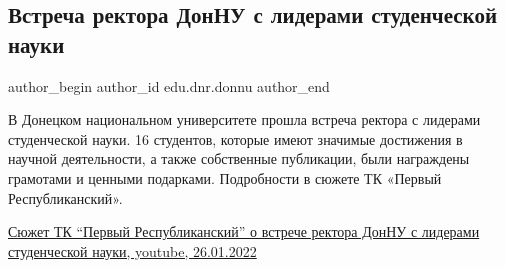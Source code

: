  
 
 
 
 
 
\subsection{Встреча ректора ДонНУ с лидерами студенческой науки}
\label{sec:26_01_2022.stz.edu.dnr.donnu.1.vstrecha_rektor_donnu_student_nauka}
 
\ifcmt
 author_begin
   author_id edu.dnr.donnu
 author_end
\fi

В Донецком национальном университете прошла встреча ректора с лидерами
студенческой науки. 16 студентов, которые имеют значимые достижения в научной
деятельности, а также собственные публикации, были награждены грамотами и
ценными подарками. Подробности в сюжете ТК «Первый Республиканский».

\href{https://www.youtube.com/watch?v=It_O0irpi2E}{%
Сюжет ТК \enquote{Первый Республиканский} о встрече ректора ДонНУ с лидерами студенческой науки, youtube, 26.01.2022%
}

